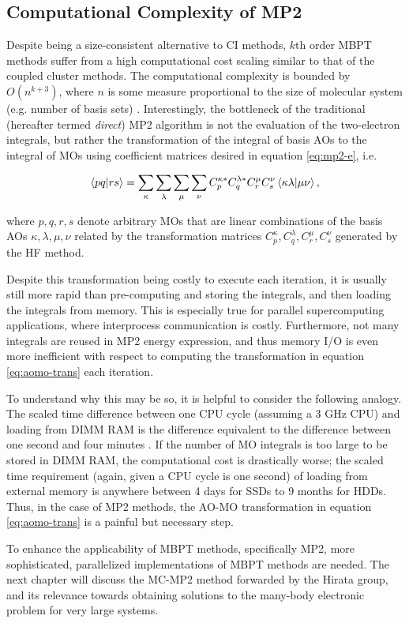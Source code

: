 \subsection{Computational Complexity of MP2}

Despite being a size-consistent alternative to CI methods, $k$th order MBPT
methods suffer from a high computational cost scaling similar to that of the
coupled cluster methods. The computational complexity is bounded by
$O(n^{k+3})$, where $n$ is some measure proportional to the size of molecular
system (e.g. number of basis sets) \cite{mbpt-book, mp2-direct}. Interestingly,
the bottleneck of the traditional (hereafter termed \emph{direct}) MP2 algorithm
is not the evaluation of the two-electron integrals, but rather the
transformation of the integral of basis AOs to the integral of MOs using
coefficient matrices desired in equation \ref{eq:mp2-e}, i.e.

\begin{equation}
	\braket{pq|rs} = \sum_\kappa \sum_\lambda \sum_\mu \sum_\nu
	C_p^{\kappa *} C_q^{\lambda *} C_r^\mu C_s^\nu \braket{\kappa\lambda | \mu\nu},
	\label{eq:aomo-trans}
\end{equation}

\noindent where $p,q,r,s$ denote arbitrary MOs that are linear combinations of
the basis AOs $\kappa,\lambda,\mu,\nu$ related by the transformation matrices
$C_p^{\kappa}, C_q^{\lambda}, C_r^\mu, C_s^\nu$ generated by the HF method.

Despite this transformation being costly to execute each iteration, it is
usually still more rapid than pre-computing and storing the integrals, and then
loading the integrals from memory. This is especially true for parallel
supercomputing applications, where interprocess communication is costly.
Furthermore, not many integrals are reused in MP2 energy expression, and thus
memory I/O is even more inefficient with respect to computing the transformation
in equation \ref{eq:aomo-trans} each iteration.

To understand why this may be so, it is helpful to consider the following
analogy. The scaled time difference between one CPU cycle (assuming a 3 GHz CPU)
and loading from DIMM RAM is the difference equivalent to the difference between
one second and four minutes \cite{systems}. If the number of MO integrals is too
large to be stored in DIMM RAM, the computational cost is drastically worse; the
scaled time requirement (again, given a CPU cycle is one second) of loading from
external memory is anywhere between 4 days for SSDs to 9 months for HDDs.  Thus,
in the case of MP2 methods, the AO-MO transformation in equation
\ref{eq:aomo-trans} is a painful but necessary step.

To enhance the applicability of MBPT methods, specifically MP2, more
sophisticated, parallelized implementations of MBPT methods are needed. The next
chapter will discuss the MC-MP2 method forwarded by the Hirata group, and its
relevance towards obtaining solutions to the many-body electronic problem for
very large systems.


